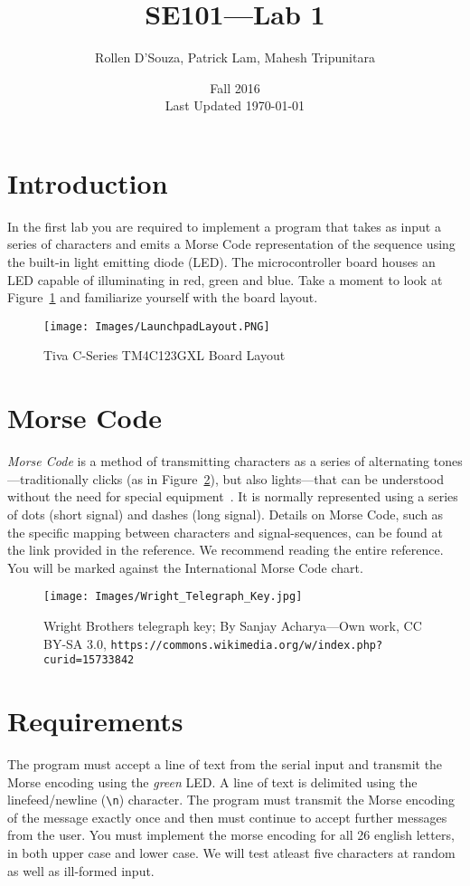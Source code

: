 \documentclass{article}
\begin{document}
\title{SE101---Lab 1}
\author{Rollen D'Souza, Patrick Lam, Mahesh Tripunitara}
\date{Fall 2016\\Last Updated \today}
\maketitle

\section*{Introduction}
In the first lab you are required to implement a program that takes as input a series of characters and emits a Morse Code representation of the sequence using the built-in light emitting diode (LED). The microcontroller board houses an LED capable of illuminating in red, green and blue.  Take a moment to look at Figure~\ref{fig:tivaLayout} and familiarize yourself with the board layout.

\begin{figure}[ht]
\centering
\texttt{[image: Images/LaunchpadLayout.PNG]}
\caption{Tiva C-Series TM4C123GXL Board Layout~\cite{tivaGuide}}
\label{fig:tivaLayout}
\end{figure}

\section*{Morse Code}
\emph{Morse Code} is a method of transmitting characters as a series of alternating tones---traditionally clicks (as in Figure~\ref{fig:key}), but also lights---that can be understood without the need for special equipment~\cite{wiki_morse}.  It is normally represented using a series of dots (short signal) and dashes (long signal).  Details on Morse Code, such as the specific mapping between characters and signal-sequences, can be found at the link provided in the reference.  We recommend reading the entire reference.  You will be marked against the International Morse Code chart.

\begin{figure}[ht]
\centering
\texttt{[image: Images/Wright\_Telegraph\_Key.jpg]}
\caption{Wright Brothers telegraph key; By Sanjay Acharya---Own work, CC BY-SA 3.0, \texttt{https://commons.wikimedia.org/w/index.php?curid=15733842}}
\label{fig:key}
\end{figure}


\section*{Requirements}
The program must accept a line of text from the serial input and transmit the Morse encoding using the \emph{green} LED.  A line of text is delimited using the linefeed/newline (\texttt{\textbackslash n}) character.  The program must transmit the Morse encoding of the message exactly once and then must continue to accept further messages from the user.  You must implement the morse encoding for all 26 english letters, in both upper case and lower case.  We will test atleast five characters at random as well as ill-formed input.
\end{document}
